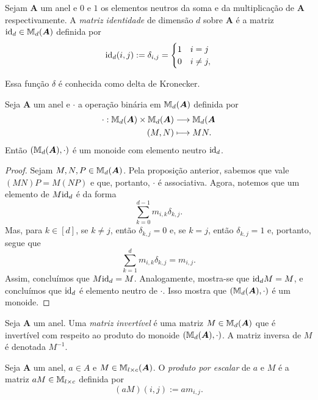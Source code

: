 \begin{defi}
	Sejam $\bm A$ um anel e $0$ e $1$ os elementos neutros da soma e da multiplicação de $\bm A$ respectivamente. A \emph{matriz identidade} de dimensão $d$ sobre $\bm A$ é a matriz $\mathrm{id}_d \in \mathbb{M}_d(\bm A)$ definida por
	\begin{equation*}
	\mathrm{id}_d(i,j) := \delta_{i,j} =
		\begin{cases}
			1 & i = j \\
			0 & i \neq j,
		\end{cases}
	\end{equation*}
\end{defi}

Essa função $\delta$ é conhecida como delta de Kronecker.

\begin{prop}
	Seja $\bm A$ um anel e $\cdot$ a operação binária em $\mathbb{M}_d(\bm A)$ definida por
	\begin{align*}
	{\cdot}: {\mathbb{M}_d(\bm A) \times \mathbb{M}_d(\bm A)} &\longrightarrow {\mathbb{M}_d(\bm A} \\{(M,N)} &\longmapsto {MN.}
	\end{align*}
Então $(\mathbb{M}_d(\bm A),\cdot)$ é um monoide com elemento neutro $\mathrm{id}_d$.
\end{prop}
\begin{proof}
	Sejam $M,N,P \in \mathbb{M}_d(\bm A)$. Pela proposição anterior, sabemos que vale $(MN)P=M(NP)$ e que, portanto, $\cdot$ é associativa. Agora, notemos que um elemento de $M\mathrm{id}_d$ é da forma
	\begin{equation*}
	\sum_{k=0}^{d-1} m_{i,k}\delta_{k,j}.
	\end{equation*}
Mas, para $k \in [d]$, se $k \neq j$, então $\delta_{k,j}=0$ e, se $k=j$, então $\delta_{k,j}=1$ e, portanto, segue que
	\begin{equation*}
	\sum_{k=1}^d m_{i,k}\delta_{k,j} = m_{i,j}.
	\end{equation*}
Assim, concluímos que $M\mathrm{id}_d=M$. Analogamente, mostra-se que $\mathrm{id}_dM=M$, e concluímos que $\mathrm{id}_d$ é elemento neutro de $\cdot$. Isso mostra que $(\mathbb{M}_d(\bm A),\cdot)$ é um monoide.
\end{proof}

\begin{defi}
	Seja $\bm A$ um anel. Uma \emph{matriz invertível} é uma matriz $M \in \mathbb{M}_d(\bm A)$ que é invertível com respeito ao produto do monoide $(\mathbb{M}_d(\bm A),\cdot)$. A matriz inversa de $M$ é denotada $M^{-1}$.
\end{defi}

\begin{defi}
	Seja $\bm A$ um anel, $a \in A$ e $M \in \mathbb{M}_{l \times c}(\bm A)$. O \emph{produto por escalar} de $a$ e $M$ é a matriz $aM \in \mathbb{M}_{l \times c}$ definida por
	\begin{equation*}
	(aM)(i,j) := am_{i,j}.
	\end{equation*}
\end{defi}

